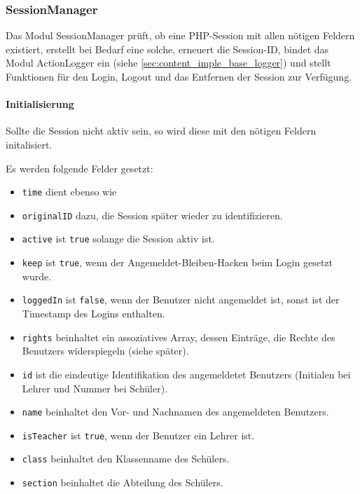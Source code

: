 \subsubsection{SessionManager}
\label{sec:content_imple_base_session}
Das Modul SessionManager prüft, ob eine PHP-Session mit allen nötigen Feldern existiert, erstellt bei Bedarf eine solche, erneuert die Session-ID, bindet das Modul ActionLogger ein (siehe \autoref{sec:content_imple_base_logger}) und stellt Funktionen für den Login, Logout und das Entfernen der Session zur Verfügung.\\
\paragraph{Initialisierung\\}
Sollte die Session nicht aktiv sein, so wird diese mit den nötigen Feldern initalisiert.

Es werden folgende Felder gesetzt:
\begin{itemize}
	\item \texttt{time} dient ebenso wie
	\item \texttt{originalID} dazu, die Session später wieder zu identifizieren.
	\item \texttt{active} ist \texttt{true} solange die Session aktiv ist.
	\item \texttt{keep} ist \texttt{true}, wenn der Angemeldet-Bleiben-Hacken beim Login gesetzt wurde.
	\item \texttt{loggedIn} ist \texttt{false}, wenn der Benutzer nicht angemeldet ist, sonst ist der Timestamp des Logins enthalten.
	\item \texttt{rights} beinhaltet ein assoziatives Array, dessen Einträge, die Rechte des Benutzers widerspiegeln (siehe später).
	\item \texttt{id} ist die eindeutige Identifikation des angemeldetet Benutzers (Initialen bei Lehrer und Nummer bei Schüler).
	\item \texttt{name} beinhaltet den Vor- und Nachnamen des angemeldeten Benutzers.
	\item \texttt{isTeacher} ist \texttt{true}, wenn der Benutzer ein Lehrer ist.
	\item \texttt{class} beinhaltet den Klassenname des Schülers.
	\item \texttt{section} beinhaltet die Abteilung des Schülers.
\end{itemize}

